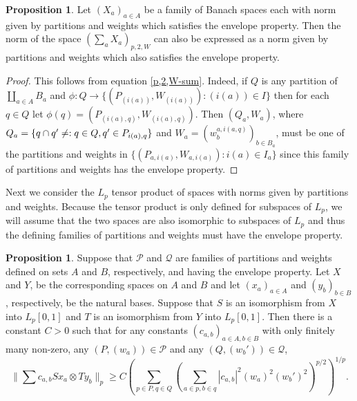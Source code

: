 \documentclass[12pt]{amsart}
\theoremstyle{definition}
\newtheorem{proposition}[theorem]{Proposition}
\theoremstyle{remark}
\numberwithin{equation}{section}
\begin{document}
\begin{proposition}\label{p,2 envelope}
Let $(X_a)_{a\in A}$ be a family of Banach spaces each with norm given
 by partitions and weights which satisfies the envelope property. Then the 
norm of the space $(\sum_a X_a)_{p,2, W}$ can also be expressed as a
 norm given by partitions and weights which also satisfies the
 envelope property.
\end{proposition}
\begin{proof}This follows from equation \ref{p,2,W-sum}. Indeed, if
$Q$ is any partition of $\coprod_{a\in A} B_a$ and \newline
$\phi:Q\rightarrow
\{(P_{(i(a))},W_{(i(a))}): (i(a)) \in I\}$ then for each $q \in Q$
let $\phi(q)=(P_{(i(a),q)},W_{(i(a),q)})$. Then
$(Q_a,W_a)$, where
$Q_a=\{q\cap q'\ne \empty: q \in Q, q'\in P_{i(a),q}\}$ and
$W_a=(w^{a,i(a,q)}_b)_{b\in B_a}$, must be one of the partitions and
weights in
$\{(P_{a,i(a)},W_{a,i(a)}):i(a)\in I_a\}$  since 
this family of partitions and weights has the envelope property.
\end{proof}

Next we consider the $L_p$ tensor product of spaces with norms given by
partitions and weights. Because the tensor product is only defined for
subspaces of $L_p$, we will assume that the two spaces are also isomorphic
to subspaces of $L_p$ and thus the defining families of partitions and
weights must have the envelope property.

\begin{proposition}\label{tensor}
Suppose that $\mathcal P$ and $\mathcal Q$ are families of partitions and
weights defined on sets $A$ and $B$, respectively, and having the envelope
property. Let $X$ and $Y$, be the corresponding spaces on $A$ and $B$ and
let $(x_a)_{a\in A}$ and $(y_b)_{b\in B}$, respectively, be the natural bases.
Suppose that $S$ is an isomorphism from $X$ into $L_p[0,1]$ and $T$ is an
isomorphism from $Y$ into $L_p[0,1]$. Then there is a constant $C>0$ such
that for any constants $(c_{a,b})_{a\in A,b \in B}$ with only finitely many
non-zero,
any $(P,(w_a))\in \mathcal P$ and any $(Q,(w_b'))\in \mathcal Q$,
$$ \|\sum c_{a,b} Sx_a \otimes Ty_b\|_p \ge C \left(\sum_{p\in P, q\in Q}
\left( \sum_{a\in p,b \in q} |c_{a,b}|^2 (w_a)^2 (w_b')^2\right )^{p/2}\right
)^{1/p}.$$
\end{proposition}
\end{document}
